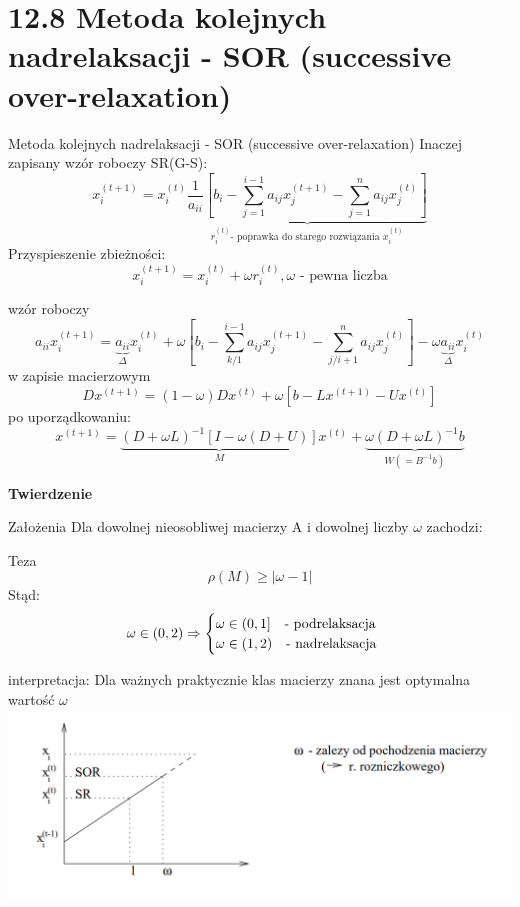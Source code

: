 \section{12.8 Metoda kolejnych nadrelaksacji - SOR (successive over-relaxation)}

\begin{frame}{Metoda kolejnych nadrelaksacji - SOR (successive over-relaxation)}
  Inaczej zapisany wzór roboczy SR(G-S):
$$x^{(t+1)}_{i}=x^{(t)}_{i} \underbrace{\frac{1}{a_{ii}}[b_i-\sum^{i-1}_{j=1} a_{ij} x^{(t+1)}_j -\sum^{n}_{j=1} a_{ij} x^{(t)}_j ]}_{r^{(t)}_i \text{- poprawka do starego rozwiązania } x^{(t)}_i}$$
  Przyspieszenie zbieżności:
  $$\boxed{x^{(t+1)}_{i}=x^{(t)}_{i}+\omega r^{(t)}_{i}}, \text{$\omega$ - pewna liczba}$$
\end{frame}

\begin{frame}
  wzór roboczy
  $$a_{ii}x^{(t+1)}_{i}=\underbrace{a_{ii}}_{\Delta}x^{(t)}_{i}+\omega[b_i-\sum^{i-1}_{k/1}a_{ij}x^{(t+1)}_{j}-\sum^{n}_{j/i+1}a_{ij}x^{(t)}_{j}]-\omega\underbrace{a_{ii}}_{\Delta}x^{(t)}_{i}$$
  w zapisie macierzowym
  $$Dx^{(t+1)}=(1-\omega )Dx^{(t)}+\omega [b-Lx^{(t+1)}-Ux^{(t)}]$$
  po uporządkowaniu:
  $$x^{(t+1)}=\underbrace{(D+\omega L)^{-1}[I-\omega (D+U)]}_{M}x^{(t)}+\underbrace{\omega(D+\omega L)^{-1}b}_{W(=B^{-1}b)}$$
\end{frame}

\begin{frame}{}
  \textbf{Twierdzenie}
  \begin{block}{Założenia}
    Dla dowolnej nieosobliwej macierzy A i dowolnej liczby $\omega$ zachodzi:
  \end{block}
  \begin{block}{Teza}
    $$\rho(M)\geq |\omega -1|$$
    Stąd:
    $$
    \omega\in(0,2) \Rightarrow
    \begin{cases}
      \omega\in{(0,1]}\text{\quad- podrelaksacja}\\
      \omega\in{(1,2)}\text{\quad- nadrelaksacja}
    \end{cases}
    $$
  \end{block}
\end{frame}

\begin{frame}{}
  interpretacja:
  Dla ważnych praktycznie klas macierzy znana jest optymalna wartość $\omega$
  \includegraphics[height=0.6\textheight, width=1\textwidth]{img/12/iteracja2}
\end{frame}

